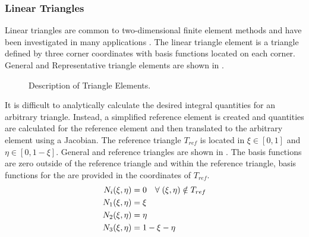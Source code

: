     \subsubsection{Linear Triangles}
      Linear triangles are common to two-dimensional finite element methods and
      have been investigated in many applications
      \cite{Hosseini2017,Hosseini2013,Hosseini2015}. The linear triangle element 
      is a triangle defined by three corner coordinates with basis functions 
      located on each corner. General and Representative triangle elements are
      shown in .

      \begin{figure}
        \centering
        \vspace{0.2in}
        \caption{Description of Triangle Elements.}
        \label{fig:triangle_elements}
      \end{figure}

      It is difficult to analytically calculate the desired integral quantities
      for an arbitrary triangle. Instead, a simplified reference element is
      created and quantities are calculated for the reference element and then
      translated to the arbitrary element using a Jacobian. 
      The reference triangle $T_{ref}$ is located in
      $\xi \in [0,1]$ and $\eta \in [0,1-\xi]$. General and reference triangles
      are shown in . The
      basis functions are zero outside of the reference triangle and within the
      reference triangle, basis functions for the are provided in the
      coordinates of $T_{ref}$.
      \begin{align}
        N_i(\xi,\eta) &= 0 \quad \forall \; (\xi,\eta) \notin T_{ref} \\
        N_1(\xi,\eta) &= \xi \\
        N_2(\xi,\eta) &= \eta \\
        N_3(\xi,\eta) &= 1-\xi-\eta
      \end{align}
      
